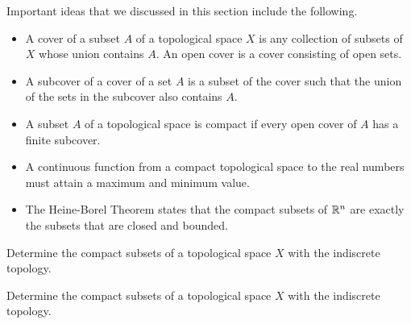 \label{sec_compact_top_summ}
Important ideas that we discussed in this section include the following.
\begin{itemize}
\item A cover of a subset $A$ of a topological space $X$ is any collection of subsets of $X$ whose union contains $A$. An open cover is a cover consisting of open sets. 
\item A subcover of a cover of a set $A$ is a subset of the cover such that the union of the sets in the subcover also contains $A$.
\item A subset $A$ of a topological space is compact if every open cover of $A$ has a finite subcover. 
\item A continuous function from a compact topological space to the real numbers must attain a maximum and minimum value. 
\item The Heine-Borel Theorem states that the compact subsets of $\mathbb{R}^n$ are exactly the subsets that are closed and bounded. 
\end{itemize}


\label{sec_compact_top_exer}

\be

\item 
	\ba
	\item Determine the compact subsets of a topological space $X$ with the indiscrete topology.
	
	\item Determine the compact subsets of a topological space $X$ with the indiscrete topology.
	
	\ea

\begin{comment}
	
\ExerciseSolution

\ba

\item Let $X$ be a topological space with the discrete topology, and let $A$ be a nonempty subset of $X$. If $\{O_{\alpha}\}_{\alpha \in I}$ is an open cover of $A$, then at least one of the open sets must be $X$. So $\{X\}$ is a finite subcover of $A$. This shows that every subset of $X$ is compact. 

\item Let $X$ be a topological space with the discrete topology. We know that finite sets are compact, so suppose that $A$ is an infinite subset of $X$. Every subset of $X$ is open, so the collection $\{\{a\}\}_{a \in A}$ is an open cover of $A$. But if we eliminate any set from this open cover, the resulting collection won't cover $A$. So we have found an open cover of $A$ with no finite subcover. We conclude that the only compact subsets of $X$ are the finite subsets. 

\ea

\end{comment}


